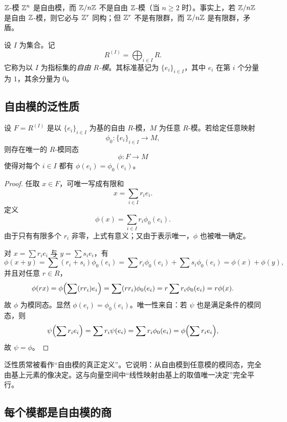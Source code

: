 \begin{example}
$\mathbb{Z}$-模 $\mathbb{Z}^n$ 是自由模，而 $\mathbb{Z}/n\mathbb{Z}$ 不是自由 $\mathbb{Z}$-模（当 $n\ge 2$ 时）。事实上，若 $\mathbb{Z}/n\mathbb{Z}$ 是自由 $\mathbb{Z}$-模，则它必与 $\mathbb{Z}^r$ 同构；但 $\mathbb{Z}^r$ 不是有限群，而 $\mathbb{Z}/n\mathbb{Z}$ 是有限群，矛盾。
\end{example}

\begin{definition}
设 $I$ 为集合。记
\[
R^{(I)}=\bigoplus_{i\in I} R.
\]
它称为以 $I$ 为指标集的\emph{自由 $R$-模}。其标准基记为 $\{e_i\}_{i\in I}$，其中 $e_i$ 在第 $i$ 个分量为 $1$，其余分量为 $0$。
\end{definition}

\subsection{自由模的泛性质}

\begin{proposition}[自由模的泛性质]
设 $F=R^{(I)}$ 是以 $\{e_i\}_{i\in I}$ 为基的自由 $R$-模，$M$ 为任意 $R$-模。若给定任意映射
\[
\phi_0\colon \{e_i\}_{i\in I}\to M,
\]
则存在唯一的 $R$-模同态
\[
\phi\colon F\to M
\]
使得对每个 $i\in I$ 都有 $\phi(e_i)=\phi_0(e_i)$。
\end{proposition}

\begin{proof}
任取 $x\in F$，可唯一写成有限和
\[
x=\sum_{i\in I} r_ie_i.
\]
定义
\[
\phi(x)=\sum_{i\in I} r_i\phi_0(e_i).
\]
由于只有有限多个 $r_i$ 非零，上式有意义；又由于表示唯一，$\phi$ 也被唯一确定。

对 $x=\sum r_ie_i$ 与 $y=\sum s_ie_i$，有
\[
\phi(x+y)=\sum (r_i+s_i)\phi_0(e_i)=\sum r_i\phi_0(e_i)+\sum s_i\phi_0(e_i)=\phi(x)+\phi(y),
\]
并且对任意 $r\in R$，
\[
\phi(rx)=\phi\Bigl(\sum (rr_i)e_i\Bigr)=\sum (rr_i)\phi_0(e_i)=r\sum r_i\phi_0(e_i)=r\phi(x).
\]
故 $\phi$ 为模同态。显然 $\phi(e_i)=\phi_0(e_i)$。唯一性来自：若 $\psi$ 也是满足条件的模同态，则
\[
\psi\Bigl(\sum r_ie_i\Bigr)=\sum r_i\psi(e_i)=\sum r_i\phi_0(e_i)=\phi\Bigl(\sum r_ie_i\Bigr),
\]
故 $\psi=\phi$。
\end{proof}

\begin{remark}
泛性质常被看作“自由模的真正定义”。它说明：从自由模到任意模的模同态，完全由基上元素的像决定。这与向量空间中“线性映射由基上的取值唯一决定”完全平行。
\end{remark}

\subsection{每个模都是自由模的商}

